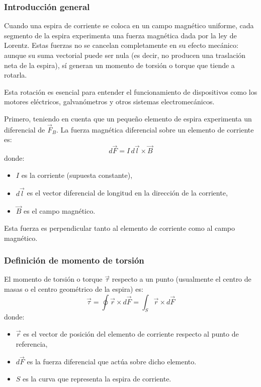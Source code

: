 \subsubsection{Introducción general}

Cuando una espira de corriente se coloca en un campo magnético uniforme, cada segmento de la espira experimenta una fuerza magnética dada por la ley de Lorentz. Estas fuerzas no se cancelan completamente en su efecto mecánico: aunque su suma vectorial puede ser nula (es decir, no producen una traslación neta de la espira), sí generan un momento de torsión o torque que tiende a rotarla.

Esta rotación es esencial para entender el funcionamiento de dispositivos como los motores eléctricos, galvanómetros y otros sistemas electromecánicos.

Primero, teniendo en cuenta que un pequeño elemento de espira experimenta un diferencial de \(\vec{F}_B\). La fuerza magnética diferencial sobre un elemento de corriente es:
\[
  d\vec{F} = I \, d\vec{l} \times \vec{B}
\]
donde:
\begin{itemize}
  \item \(I\) es la corriente (supuesta constante),
  \item \(d\vec{l}\) es el vector diferencial de longitud en la dirección de la corriente,
  \item \(\vec{B}\) es el campo magnético.
\end{itemize}
\begin{tcolorbox}[myconclusion]
  Esta fuerza es perpendicular tanto al elemento de corriente como al campo magnético.
\end{tcolorbox}

\subsubsection{Definición de momento de torsión}

El momento de torsión o torque \(\vec{\tau}\) respecto a un punto (usualmente el centro de masas o el centro geométrico de la espira) es:
\[
\vec{\tau} = \oint \vec{r} \times d\vec{F} =\int_S \vec{r} \times d\vec{F}
\]
donde:
\begin{itemize}
  \item \(\vec{r}\) es el vector de posición del elemento de corriente respecto al punto de referencia,
  \item \(d\vec{F}\) es la fuerza diferencial que actúa sobre dicho elemento.
  \item \(S\) es la curva que representa la espira de corriente.
\end{itemize}

